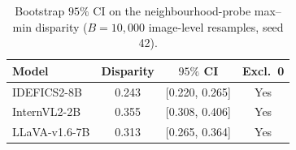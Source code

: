 \begin{table}[t]\centering\small
\caption{Bootstrap $95\%$ CI on the neighbourhood-probe max--min disparity ($B{=}10{,}000$ image-level resamples, seed 42).}
\label{tab:neigh-boot}
\begin{tabular}{lccc}
\toprule
Model & Disparity & $95\%$ CI & Excl.\ 0 \\
\midrule
IDEFICS2-8B & 0.243 & [0.220, 0.265] & Yes \\
InternVL2-2B & 0.355 & [0.308, 0.406] & Yes \\
LLaVA-v1.6-7B & 0.313 & [0.265, 0.364] & Yes \\
\bottomrule
\end{tabular}
\end{table}

